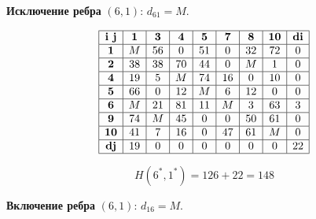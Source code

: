 \documentclass[17pt]{extarticle}
\begin{document}
\textbf{Исключение ребра} \((6,1)\): \( d_{61} = M \).

\[
    \begin{array}{|c|c|c|c|c|c|c|c|c|}
        \hline
        \textbf{i j} & \textbf{1} & \textbf{3} & \textbf{4} & \textbf{5} & \textbf{7} & \textbf{8} & \textbf{10} & \textbf{di} \\
        \hline
        \textbf{1}   & M          & 56         & 0          & 51         & 0          & 32         & 72          & 0           \\
        \hline
        \textbf{2}   & 38         & 38         & 70         & 44         & 0          & M          & 1           & 0           \\
        \hline
        \textbf{4}   & 19         & 5          & M          & 74         & 16         & 0          & 10          & 0           \\
        \hline
        \textbf{5}   & 66         & 0          & 12         & M          & 6          & 12         & 0           & 0           \\
        \hline
        \textbf{6}   & M          & 21         & 81         & 11         & M          & 3          & 63          & 3           \\
        \hline
        \textbf{9}   & 74         & M          & 45         & 0          & 0          & 50         & 61          & 0           \\
        \hline
        \textbf{10}  & 41         & 7          & 16         & 0          & 47         & 61         & M           & 0           \\
        \hline
        \textbf{dj}  & 19         & 0          & 0          & 0          & 0          & 0          & 0           & 22          \\
        \hline
    \end{array}
\]

\[ H(6^*,1^*) = 126 + 22 = 148 \]

\textbf{Включение ребра} \((6,1)\): \( d_{16} = M \).
\end{document}
